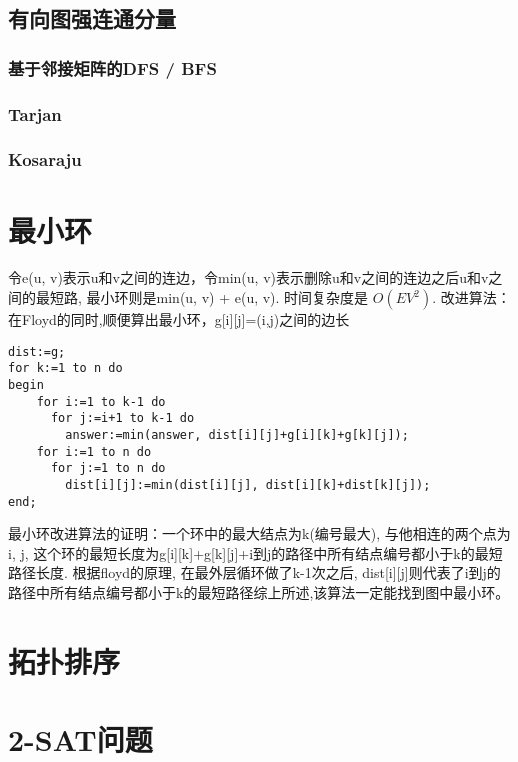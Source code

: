 \subsection{有向图强连通分量}
\subsubsection{基于邻接矩阵的DFS / BFS}


\subsubsection{Tarjan}


\subsubsection{Kosaraju}


\section{最小环}
令e(u, v)表示u和v之间的连边，令min(u, v)表示删除u和v之间的连边之后u和v之间的最短路, 最小环则是min(u, v) + e(u, v). 时间复杂度是 $O(EV^2)$. 
改进算法：在Floyd的同时,顺便算出最小环，g[i][j]=(i,j)之间的边长
\begin{lstlisting}
dist:=g;
for k:=1 to n do
begin
    for i:=1 to k-1 do
      for j:=i+1 to k-1 do
        answer:=min(answer, dist[i][j]+g[i][k]+g[k][j]);
    for i:=1 to n do
      for j:=1 to n do
        dist[i][j]:=min(dist[i][j], dist[i][k]+dist[k][j]);
end;
\end{lstlisting}
最小环改进算法的证明：一个环中的最大结点为k(编号最大), 与他相连的两个点为i, j, 这个环的最短长度为g[i][k]+g[k][j]+i到j的路径中所有结点编号都小于k的最短路径长度. 根据floyd的原理, 在最外层循环做了k-1次之后, dist[i][j]则代表了i到j的路径中所有结点编号都小于k的最短路径综上所述,该算法一定能找到图中最小环。


\section{拓扑排序}



\section{2-SAT问题}
